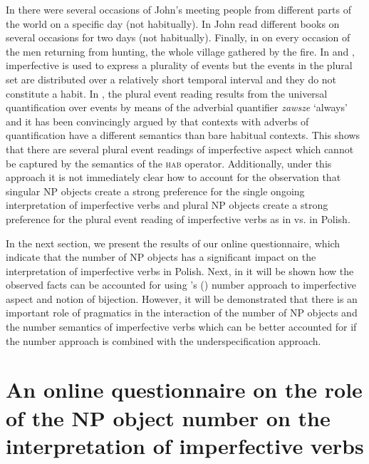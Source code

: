 \documentclass[output=paper]{langscibook}
\begin{document}
\noindent In  there were several occasions of John’s meeting people from different parts of the world on a specific day (not habitually). In  John read different books on several occasions for two days (not habitually). Finally, in  on every occasion of the men returning from hunting, the whole village gathered by the fire. In  and , imperfective is used to express a plurality of events but the events in the plural set are distributed over a relatively short temporal interval and they do not constitute a habit. In , the plural event reading results from the universal quantification over events by means of the adverbial quantifier \textit{zawsze} ‘always’ and it has been convincingly argued by \citet{Ferreira2004, Ferreira2005} that contexts with adverbs of quantification have a different semantics than bare habitual contexts. This shows that there are several plural event readings of imperfective aspect which cannot be captured by the semantics of the \textsc{hab} operator. Additionally, under this approach it is not immediately clear how to account for the observation that singular NP objects create a strong preference for the single ongoing interpretation of imperfective verbs and plural NP objects create a strong preference for the plural event reading of imperfective verbs as in  vs.  in Polish. 

In the next section, we present the results of our online questionnaire, which indicate that the number of NP objects has a significant impact on the interpretation of imperfective verbs in Polish. Next, in  it will be shown how the observed facts can be accounted for using \citeauthor{Ferreira2004}'s (\citeyear{Ferreira2004, Ferreira2005}) number approach to imperfective aspect and  notion of bijection. However, it will be demonstrated that there is an important role of pragmatics in the interaction of the number of NP objects and the number semantics of imperfective verbs which can be better accounted for if the number approach is combined with the underspecification approach.

\section{An online questionnaire on the role of the NP object number on the interpretation of imperfective verbs}\label{jan-bla:fansb:kb:sec3}
\end{document}
